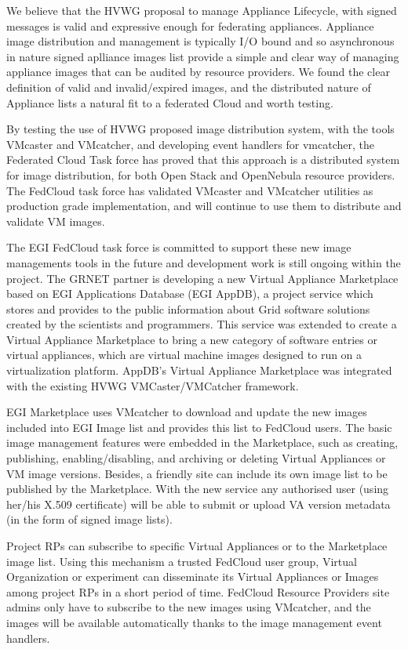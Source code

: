 \documentclass{cai}
\begin{document}
We believe that the HVWG proposal to manage Appliance Lifecycle, with signed messages is valid and expressive enough for federating appliances. 
Appliance image distribution and management is typically I/O bound and so asynchronous in nature signed aplliance images list provide a simple and clear way of managing appliance images that can be audited by resource providers. 
We found the clear definition of valid and invalid/expired images, and the distributed nature of Appliance lists a natural fit to a federated Cloud and worth testing.

By testing the use of HVWG proposed image distribution system, with the tools VMcaster and VMcatcher, and developing event handlers for vmcatcher, the Federated Cloud Task force has proved that this approach is a distributed system for image distribution, for both Open Stack and OpenNebula resource providers. 
The FedCloud task force has validated VMcaster and VMcatcher utilities as production grade implementation, and will continue to use them to distribute and validate VM images.

The EGI FedCloud task force is committed to support these new image managements tools in the future and development work is still ongoing within the project. 
The GRNET partner is developing a new Virtual Appliance Marketplace based on EGI Applications Database (EGI AppDB), a project service which stores and provides to the public information about Grid software solutions created by the scientists and programmers.
This service was extended to create a Virtual Appliance Marketplace to bring a new category of software entries or virtual appliances, which are virtual machine images designed to run on a virtualization platform.
AppDB's Virtual Appliance Marketplace was integrated with the existing HVWG VMCaster/VMCatcher framework.

EGI Marketplace uses VMcatcher to download and update the new images included into EGI Image list and provides this list to FedCloud users.  
The basic image management features were embedded in the Marketplace, such as creating, publishing, enabling/disabling, and archiving or deleting Virtual Appliances or VM image versions.
Besides, a friendly site can include its own image list to be published by the Marketplace. 
With the new service any authorised user (using her/his X.509 certificate) will be able to submit or upload VA version metadata (in the form of signed image lists).
 
Project RPs can subscribe to specific Virtual Appliances or to the Marketplace image list. Using this mechanism a trusted FedCloud user group, Virtual Organization or experiment can disseminate its Virtual Appliances or Images among project RPs in a short period of time.
FedCloud Resource Providers site admins only have to subscribe to the new images using VMcatcher, and the images will be available automatically thanks to the image management event handlers.
\end{document}
